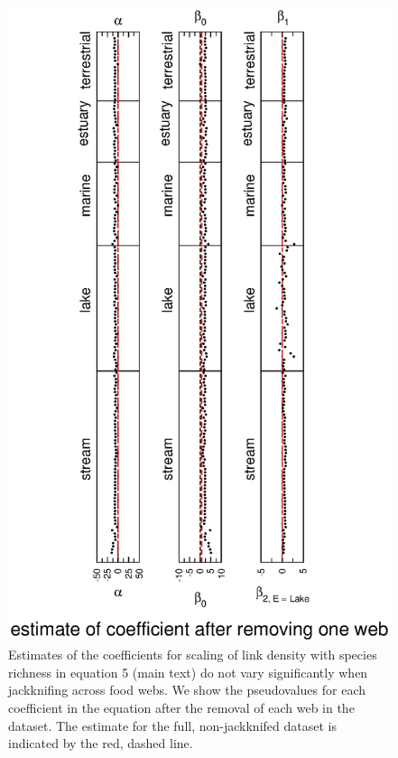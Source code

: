 \documentclass[12pt]{article}
\begin{document}
    \begin{figure}[!h]
    \centerline{\includegraphics*[height=.75\textheight]{Figures/Jackknife/LS_web.eps}}
    \caption{Estimates of the coefficients for scaling of link density with species richness
    in equation 5 (main text) do not vary significantly when jackknifing across food webs. 
    We show the pseudovalues for each coefficient in the equation after the removal of each 
    web in the dataset. The estimate for the full, non-jackknifed dataset is indicated by 
    the red, dashed line.}
    \label{LS_web}
    \end{figure}
\end{document}
